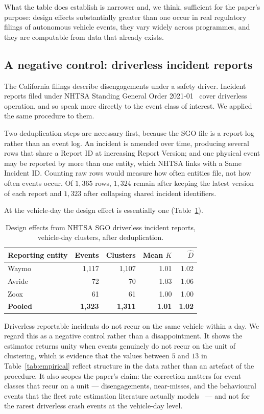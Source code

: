 \documentclass[11pt]{article}
\begin{document}
What the table does establish is narrower and, we think, sufficient for the
paper's purpose: design effects substantially greater than one occur in real
regulatory filings of autonomous vehicle events, they vary widely across
programmes, and they are computable from data that already exists.

\subsection{A negative control: driverless incident reports}
\label{sec:negcontrol}

The California filings describe disengagements under a safety driver. Incident
reports filed under NHTSA Standing General Order
2021-01~\cite{nhtsa_sgo} cover driverless operation, and so speak more directly
to the event class of interest. We applied the same procedure to them.

Two deduplication steps are necessary first, because the SGO file is a report
log rather than an event log. An incident is amended over time, producing
several rows that share a Report ID at increasing Report Version; and one
physical event may be reported by more than one entity, which NHTSA links with a
Same Incident ID. Counting raw rows would measure how often entities file, not
how often events occur. Of $1{,}365$ rows, $1{,}324$ remain after keeping the
latest version of each report and $1{,}323$ after collapsing shared incident
identifiers.

At the vehicle-day the design effect is essentially one (Table~\ref{tab:sgo}).

\begin{table}[htbp]
\centering
\caption{Design effects from NHTSA SGO driverless incident reports, vehicle-day
clusters, after deduplication.}
\label{tab:sgo}
\begin{tabular}{lrrrr}
\toprule
Reporting entity & Events & Clusters & Mean $K$ & $\hat{D}$ \\
\midrule
Waymo & 1,117 & 1,107 & 1.01 & 1.02 \\
Avride & 72 & 70 & 1.03 & 1.06 \\
Zoox & 61 & 61 & 1.00 & 1.00 \\
\midrule
\textbf{Pooled} & \textbf{1,323} & \textbf{1,311} & \textbf{1.01} &
\textbf{1.02} \\
\bottomrule
\end{tabular}
\end{table}

Driverless reportable incidents do not recur on the same vehicle within a day.
We regard this as a negative control rather than a disappointment. It shows the
estimator returns unity when events genuinely do not recur on the unit of
clustering, which is evidence that the values between $5$ and $13$ in
Table~\ref{tab:empirical} reflect structure in the data rather than an artefact
of the procedure. It also scopes the paper's claim: the correction matters for
event classes that recur on a unit --- disengagements, near-misses, and the
behavioural events that the fleet rate estimation literature actually
models~\cite{terres2023behavioral} --- and not for the rarest driverless crash
events at the vehicle-day level.
\end{document}

